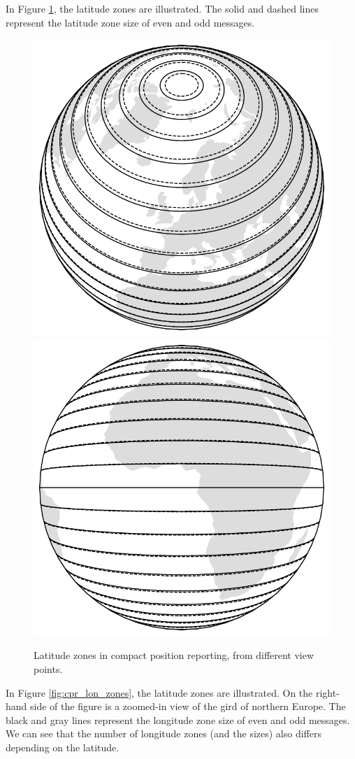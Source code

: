 In Figure \ref{fig:cpr_lat_zones}, the latitude zones are illustrated. The solid and dashed lines represent the latitude zone size of even and odd messages.

\begin{figure}
  \includegraphics[width=0.7\linewidth]{figures/adsb/cpr_lat_zone_high.pdf} 
  \vspace{0.5cm}
  \includegraphics[width=0.7\linewidth]{figures/adsb/cpr_lat_zone_low.pdf}
  \caption{Latitude zones in compact position reporting, from different view points.}
  \label{fig:cpr_lat_zones}
\end{figure}

In Figure \ref{fig:cpr_lon_zones}, the latitude zones are illustrated. On the right-hand side of the figure is a zoomed-in view of the gird of northern Europe. The black and gray lines represent the longitude zone size of even and odd messages. We can see that the number of longitude zones (and the sizes) also differs depending on the latitude.

